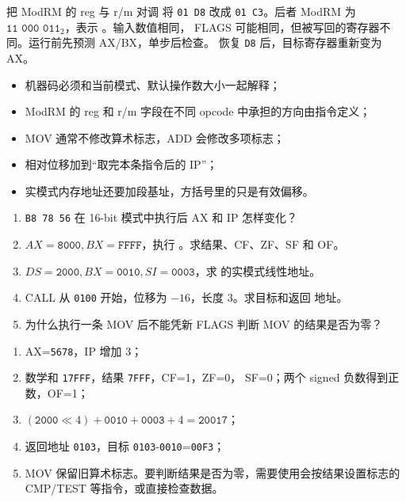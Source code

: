 \begin{faultinjectionbox}{把 ModRM 的 reg 与 r/m 对调}
将 \texttt{01 D8} 改成 \texttt{01 C3}。后者 ModRM 为
\(\texttt{11 000 011}_2\)，表示 。输入数值相同，
FLAGS 可能相同，但被写回的寄存器不同。运行前先预测 AX/BX，单步后检查。
恢复 \texttt{D8} 后，目标寄存器重新变为 AX。
\end{faultinjectionbox}

\begin{pitfallbox}
\begin{itemize}[leftmargin=2.2em]
  \item 机器码必须和当前模式、默认操作数大小一起解释；
  \item ModRM 的 reg 和 r/m 字段在不同 opcode 中承担的方向由指令定义；
  \item MOV 通常不修改算术标志，ADD 会修改多项标志；
  \item 相对位移加到“取完本条指令后的 IP”；
  \item 实模式内存地址还要加段基址，方括号里的只是有效偏移。
\end{itemize}
\end{pitfallbox}


\begin{enumerate}[leftmargin=2.2em]
  \item \texttt{B8 78 56} 在 16-bit 模式中执行后 AX 和 IP 怎样变化？
  \item \(AX=\texttt{8000},BX=\texttt{FFFF}\)，执行
    。求结果、CF、ZF、SF 和 OF。
  \item \(DS=\texttt{2000},BX=\texttt{0010},SI=\texttt{0003}\)，求
    \code{[bx+si+4]} 的实模式线性地址。
  \item CALL 从 \texttt{0100} 开始，位移为 \(-16\)，长度 3。求目标和返回
    地址。
  \item 为什么执行一条 MOV 后不能凭新 FLAGS 判断 MOV 的结果是否为零？
\end{enumerate}

\begin{answerbox}
\begin{enumerate}[leftmargin=2.2em]
  \item AX=\texttt{5678}，IP 增加 3；
  \item 数学和 \texttt{17FFF}，结果 \texttt{7FFF}，CF=1，ZF=0，
    SF=0；两个 signed 负数得到正数，OF=1；
  \item \((\texttt{2000}\ll4)+\texttt{0010}+\texttt{0003}+4
    =\texttt{20017}\)；
  \item 返回地址 \texttt{0103}，目标
    \texttt{0103}-\texttt{0010}=\texttt{00F3}；
  \item MOV 保留旧算术标志。要判断结果是否为零，需要使用会按结果设置标志的
    CMP/TEST 等指令，或直接检查数据。
\end{enumerate}
\end{answerbox}
